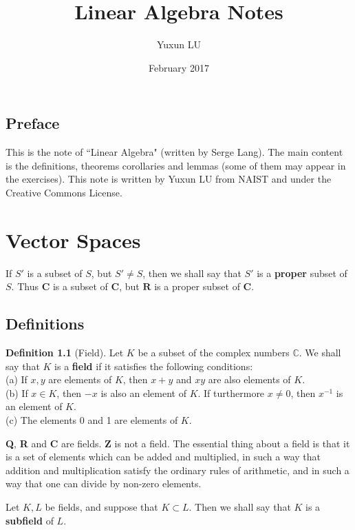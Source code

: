 \documentclass{book}
\title{Linear Algebra Notes}
\author{Yuxun LU}
\date{February 2017}
\theoremstyle{definition}
\newtheorem{definition}{Definition}[section]
\begin{document}
\maketitle
\section*{Preface}
This is the note of ``Linear Algebra" (written by Serge Lang). The main content is the definitions, theorems corollaries and lemmas (some of them may appear in the exercises). This note is written by Yuxun LU from NAIST and under the Creative Commons License.
\tableofcontents
\mainmatter
\chapter{Vector Spaces}
If $S'$ is a subset of $S$, but $S' \neq S$, then we shall say that $S'$ is a \textbf{proper} subset of $S$. Thus $\mathbf{C}$ is a subset of $\mathbf{C}$, but $\mathbf{R}$ is a proper subset of $\mathbf{C}$.
\section{Definitions}
\begin{definition}[Field]
Let $K$ be a subset of the complex numbers $\mathbb{C}$. We shall say that $K$ is a \textbf{field} if it satisfies the following conditions:
\\(a) If $x,y$ are elements of $K$, then $x+y$ and $xy$ are also elements of $K$.
\\(b) If $x \in K$, then $-x$ is also an element of $K$. If turthermore $x \neq 0$, then $x^{-1}$ is an element of $K$.
\\(c) The elements 0 and 1 are elements of $K$.
\end{definition}
\textbf{Q}, \textbf{R} and \textbf{C} are fields. \textbf{Z} is not a field. The essential thing about a field is that it is a set of elements which can be added and multiplied, in such a way that addition and multiplication satisfy the ordinary rules of arithmetic, and in such a way that one can divide by non-zero elements.

Let $K,L$ be fields, and suppose that $K \subset L$. Then we shall say that $K$ is a \textbf{subfield} of $L$.
\end{document}
